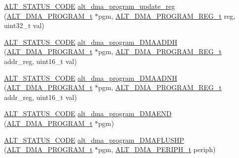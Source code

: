 \begin{DoxyCompactItemize}
\mbox{\hyperlink{hwlib_8h_abdb0d369f069723ca55d6c94bcaaaa12}{A\+L\+T\+\_\+\+S\+T\+A\+T\+U\+S\+\_\+\+C\+O\+DE}} \mbox{\hyperlink{group__ALT__DMA__PRG_ga084ec9062e0c500f86eedf7670a508f5}{alt\+\_\+dma\+\_\+program\+\_\+update\+\_\+reg}} (\mbox{\hyperlink{group__ALT__DMA__PRG_gadb7028531574894854db4db6d797de97}{A\+L\+T\+\_\+\+D\+M\+A\+\_\+\+P\+R\+O\+G\+R\+A\+M\+\_\+t}} $\ast$pgm, \mbox{\hyperlink{group__ALT__DMA__PRG_ga772371a3d6334e110911154cf94950e8}{A\+L\+T\+\_\+\+D\+M\+A\+\_\+\+P\+R\+O\+G\+R\+A\+M\+\_\+\+R\+E\+G\+\_\+t}} reg, uint32\+\_\+t val)
\item 
\mbox{\hyperlink{hwlib_8h_abdb0d369f069723ca55d6c94bcaaaa12}{A\+L\+T\+\_\+\+S\+T\+A\+T\+U\+S\+\_\+\+C\+O\+DE}} \mbox{\hyperlink{group__ALT__DMA__PRG_ga4d3de32f2f2fd611f975efb050352b84}{alt\+\_\+dma\+\_\+program\+\_\+\+D\+M\+A\+A\+D\+DH}} (\mbox{\hyperlink{group__ALT__DMA__PRG_gadb7028531574894854db4db6d797de97}{A\+L\+T\+\_\+\+D\+M\+A\+\_\+\+P\+R\+O\+G\+R\+A\+M\+\_\+t}} $\ast$pgm, \mbox{\hyperlink{group__ALT__DMA__PRG_ga772371a3d6334e110911154cf94950e8}{A\+L\+T\+\_\+\+D\+M\+A\+\_\+\+P\+R\+O\+G\+R\+A\+M\+\_\+\+R\+E\+G\+\_\+t}} addr\+\_\+reg, uint16\+\_\+t val)
\item 
\mbox{\hyperlink{hwlib_8h_abdb0d369f069723ca55d6c94bcaaaa12}{A\+L\+T\+\_\+\+S\+T\+A\+T\+U\+S\+\_\+\+C\+O\+DE}} \mbox{\hyperlink{group__ALT__DMA__PRG_ga6ef3213e6714e4aec03191ccdd563fe7}{alt\+\_\+dma\+\_\+program\+\_\+\+D\+M\+A\+A\+D\+NH}} (\mbox{\hyperlink{group__ALT__DMA__PRG_gadb7028531574894854db4db6d797de97}{A\+L\+T\+\_\+\+D\+M\+A\+\_\+\+P\+R\+O\+G\+R\+A\+M\+\_\+t}} $\ast$pgm, \mbox{\hyperlink{group__ALT__DMA__PRG_ga772371a3d6334e110911154cf94950e8}{A\+L\+T\+\_\+\+D\+M\+A\+\_\+\+P\+R\+O\+G\+R\+A\+M\+\_\+\+R\+E\+G\+\_\+t}} addr\+\_\+reg, uint16\+\_\+t val)
\item 
\mbox{\hyperlink{hwlib_8h_abdb0d369f069723ca55d6c94bcaaaa12}{A\+L\+T\+\_\+\+S\+T\+A\+T\+U\+S\+\_\+\+C\+O\+DE}} \mbox{\hyperlink{group__ALT__DMA__PRG_ga499e8cedf97fd3b92223100fdc9180c7}{alt\+\_\+dma\+\_\+program\+\_\+\+D\+M\+A\+E\+ND}} (\mbox{\hyperlink{group__ALT__DMA__PRG_gadb7028531574894854db4db6d797de97}{A\+L\+T\+\_\+\+D\+M\+A\+\_\+\+P\+R\+O\+G\+R\+A\+M\+\_\+t}} $\ast$pgm)
\item 
\mbox{\hyperlink{hwlib_8h_abdb0d369f069723ca55d6c94bcaaaa12}{A\+L\+T\+\_\+\+S\+T\+A\+T\+U\+S\+\_\+\+C\+O\+DE}} \mbox{\hyperlink{group__ALT__DMA__PRG_ga4102d413f2b01d08869311191a10844c}{alt\+\_\+dma\+\_\+program\+\_\+\+D\+M\+A\+F\+L\+U\+S\+HP}} (\mbox{\hyperlink{group__ALT__DMA__PRG_gadb7028531574894854db4db6d797de97}{A\+L\+T\+\_\+\+D\+M\+A\+\_\+\+P\+R\+O\+G\+R\+A\+M\+\_\+t}} $\ast$pgm, \mbox{\hyperlink{group__ALT__DMA__COMMON_gae9baf8ac891f0583f9c1c61528cc1736}{A\+L\+T\+\_\+\+D\+M\+A\+\_\+\+P\+E\+R\+I\+P\+H\+\_\+t}} periph)

\end{DoxyCompactItemize}
